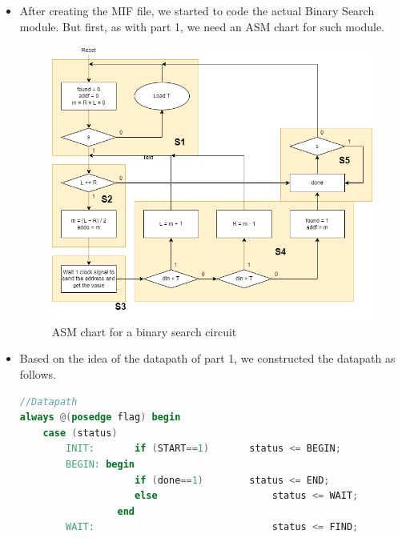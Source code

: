 \begin{itemize}
\begin{itemize}
\begin{lstlisting}[language=verilog]
CONTENT BEGIN
	00  :   01;
	01  :   02;
	02  :   03;
	03  :   05;
	[04..05]  :   06;
	06  :   07;
	[07..08]  :   08;
	09  :   0A;
	[0A..0B]  :   0B;
	0C  :   10;
	0D  :   11;
	[0E..0F]  :   12;
	10  :   13;
	11  :   14;
	12  :   15;
	13  :   17;
	14  :   18;
	[15..16]  :   19;
	17  :   1A;
	18  :   1B;
	19  :   1C;
	1A  :   1D;
	[1B..1C]  :   1E;
	[1D..1E]  :   1F;
	1F  :   20;
END;
                \end{lstlisting}
            \item []After creating the MIF file, we started to code the actual Binary Search module. But first, as with part 1, we need an ASM chart for such module.
                \begin{figure}[h]
                    \centering
                    \includegraphics[width=6in]{source/picture/Lab11/asm.drawio.png}
                    \caption{ASM chart for a binary search circuit}
                    \label{fig:my_label}
                \end{figure} 
            \item [] Based on the idea of the datapath of part 1, we constructed the datapath as follows.
                \begin{lstlisting}[language=verilog]
//Datapath
always @(posedge flag) begin
    case (status)
        INIT:		if (START==1)		status <= BEGIN;
        BEGIN: begin	
                    if (done==1) 		status <= END;
                    else					status <= WAIT;
                 end
        WAIT:								status <= FIND;

\end{lstlisting}
\end{itemize}
\end{itemize}
